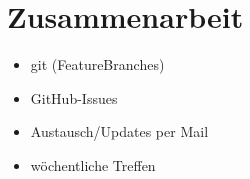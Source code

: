 \section{Zusammenarbeit}
	\begin{itemize}
		\item git (FeatureBranches)
		\item GitHub-Issues
		\item Austausch/Updates per Mail
		\item wöchentliche Treffen
	\end{itemize}